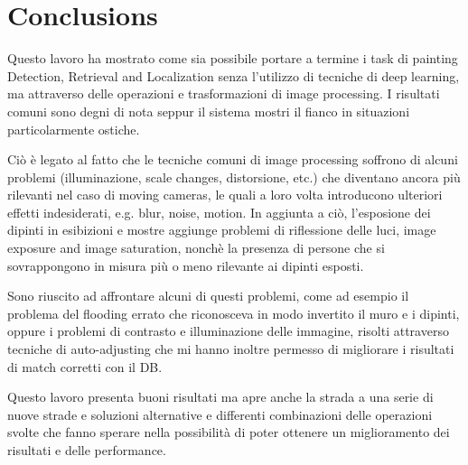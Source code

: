 \documentclass[10pt,twocolumn,letterpaper]{article}
\begin{document}
\section{Conclusions}
Questo lavoro ha mostrato come sia possibile portare a termine i task di painting Detection, Retrieval and Localization senza l'utilizzo di tecniche di deep learning, ma attraverso delle operazioni e trasformazioni di image processing. I risultati comuni sono degni di nota seppur il sistema mostri il fianco in situazioni particolarmente ostiche.

Ciò è legato al fatto che le tecniche comuni di image processing soffrono di alcuni problemi (illuminazione, scale changes, distorsione, etc.) che diventano ancora più rilevanti nel caso di moving cameras, le quali a loro volta introducono ulteriori effetti indesiderati, e.g. blur, noise, motion. 
In aggiunta a ciò, l'esposione dei dipinti in esibizioni e mostre aggiunge problemi di riflessione delle luci, image exposure and image saturation, nonchè la presenza di persone che si sovrappongono in misura più o meno rilevante ai dipinti esposti.

Sono riuscito ad affrontare alcuni di questi problemi, come ad esempio il problema del flooding errato che riconosceva in modo invertito il muro e i dipinti, oppure i problemi di contrasto e illuminazione delle immagine, risolti attraverso tecniche di auto-adjusting che mi hanno inoltre permesso di migliorare i risultati di match corretti con il DB.

Questo lavoro presenta buoni risultati ma apre anche la strada a una serie di nuove strade e soluzioni alternative e differenti combinazioni delle operazioni svolte che fanno sperare nella possibilità di poter ottenere un miglioramento dei risultati e delle performance.


{\small


}
\end{document}
